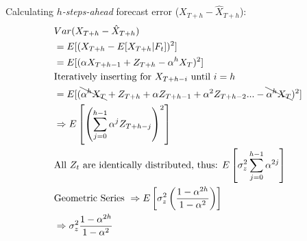 \quad Calculating \textit{$h$-steps-ahead} forecast error ($X_{T+h}-\hat{X}_{T+h}$):
\begin{align*}
    & Var(X_{T+h}-\hat{X}_{T+h}) \\
    &= E[(X_{T+h} - E[X_{T+h}|F_t])^2 ] \\
    &= E[(\alpha X_{T+h-1} +Z_{T+h} - \alpha^h X_T)^2 ] \\
    &\text{Iteratively inserting for $X_{T+h-i}$ until $i=h$ }\\
    &= E[(\bcancel{\alpha^h X_T} + Z_{T+h} +\alpha Z_{T+h-1} + \alpha^2 Z_{T+h-2} ... - \bcancel{\alpha^h X_T} )^2 ]\\
    &\Rightarrow E\left[\left(\sum_{j=0}^{h-1} \alpha^j Z_{T+h-j} \right)^2 \right] \\
    &\text{All $Z_t$ are identically distributed, thus: } E \left[ \sigma_z^2 \sum_{j=0}^{h-1} \alpha^{2j}  \right] \\
    &\text{Geometric Series } \Rightarrow E \left[ \sigma_z^2 \left( \frac{1-\alpha^{2h}}{1-\alpha^2} \right) \right] \\
    & \Rightarrow \sigma_z^2 \frac{1-\alpha^{2h}}{1-\alpha^2}
\end{align*}